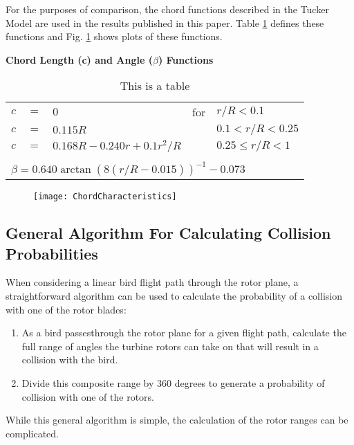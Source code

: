 \documentclass[10pt,conference]{IEEEtran}
\begin{document}
For the purposes of comparison, the chord functions described in the Tucker Model are used in the results published in
this paper. Table \ref{ChordFunctions} defines these functions and Fig. \ref{fig.ChordCharacteristics} shows plots of
these functions.
\begin{table}
  \centering
  \textbf{Chord Length (c) and Angle ($\beta$) Functions}\\
    \begin{tabular}{|lllll|}
  \hline
    $c$ & $=$ & $0$ & for & $r/R< 0.1$ \\
    $c$ & $=$ & $0.115R$ && $0.1 < r/R < 0.25$ \\
    $c$ & $=$ & $0.168R-0.240r+0.1r^2/R$ && $0.25 \leq r/R < 1$ \\
    &&&&\\
    \multicolumn{5}{|l|}{$\beta = 0.640 \arctan(8(r/R-0.015))^{-1}-0.073$}\\
  \hline
    \end{tabular}
  \caption{This is a table}\label{ChordFunctions}
\end{table}

\begin{figure}
   \centering
   \texttt{[image: ChordCharacteristics]}
   \caption{}
   \label{fig.ChordCharacteristics}
\end{figure}

\subsection{General Algorithm For Calculating Collision Probabilities}
When considering a linear bird flight path through the rotor plane, a straightforward algorithm can be used to
calculate the probability of a collision with one of the rotor blades:
\begin{enumerate}
  \item As a bird passesthrough the rotor plane for a given flight path, calculate the full range of angles the turbine rotors can take on that will result in a collision with the bird.
  \item Divide this composite range by 360 degrees to generate a probability of collision with one of the rotors.
\end{enumerate}
While this general algorithm is simple, the calculation of the rotor ranges can be complicated.
\end{document}
